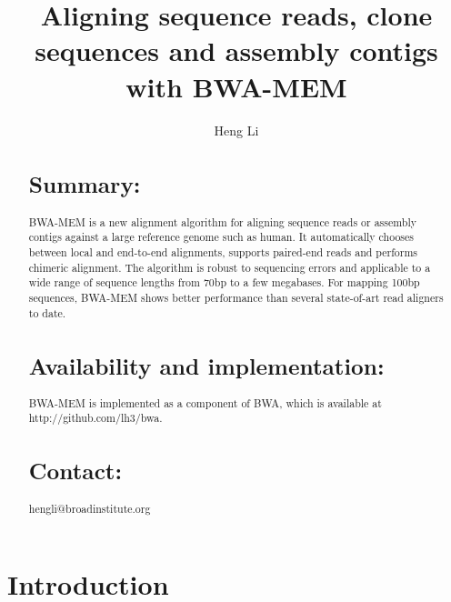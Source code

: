 \documentclass{bioinfo}
\begin{document}

\title{Aligning sequence reads, clone sequences and assembly contigs with BWA-MEM}

\author[Li]{Heng Li}

\address{Broad Institute of Harvard and MIT, 7 Cambridge Center, Cambridge, MA 02142, USA}

\maketitle

\begin{abstract}
\section{Summary:} BWA-MEM is a new alignment algorithm for aligning sequence
reads or assembly contigs against a large reference genome such as human.
It automatically chooses between local and end-to-end alignments, supports
paired-end reads and performs chimeric alignment. The algorithm is robust to
sequencing errors and applicable to a wide range of sequence lengths from 70bp
to a few megabases. For mapping 100bp sequences, BWA-MEM shows better
performance than several state-of-art read aligners to date.

\section{Availability and implementation:} BWA-MEM is implemented as a
component of BWA, which is available at http://github.com/lh3/bwa.

\section{Contact:} hengli@broadinstitute.org
\end{abstract}

\section{Introduction}
\end{document}
